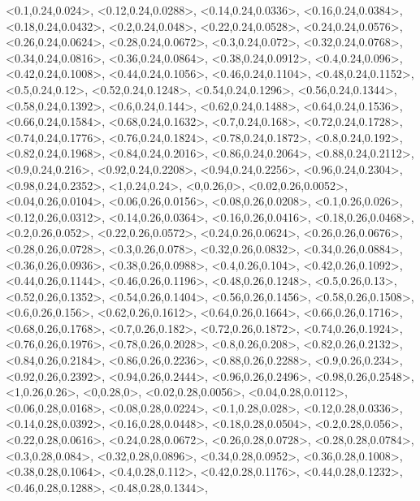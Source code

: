 \documentclass[a4paper,10pt]{article}
\begin{document}
\begin{eulernotebook}
\begin{euleroutput}
  <0.1,0.24,0.024>,
  <0.12,0.24,0.0288>,
  <0.14,0.24,0.0336>,
  <0.16,0.24,0.0384>,
  <0.18,0.24,0.0432>,
  <0.2,0.24,0.048>,
  <0.22,0.24,0.0528>,
  <0.24,0.24,0.0576>,
  <0.26,0.24,0.0624>,
  <0.28,0.24,0.0672>,
  <0.3,0.24,0.072>,
  <0.32,0.24,0.0768>,
  <0.34,0.24,0.0816>,
  <0.36,0.24,0.0864>,
  <0.38,0.24,0.0912>,
  <0.4,0.24,0.096>,
  <0.42,0.24,0.1008>,
  <0.44,0.24,0.1056>,
  <0.46,0.24,0.1104>,
  <0.48,0.24,0.1152>,
  <0.5,0.24,0.12>,
  <0.52,0.24,0.1248>,
  <0.54,0.24,0.1296>,
  <0.56,0.24,0.1344>,
  <0.58,0.24,0.1392>,
  <0.6,0.24,0.144>,
  <0.62,0.24,0.1488>,
  <0.64,0.24,0.1536>,
  <0.66,0.24,0.1584>,
  <0.68,0.24,0.1632>,
  <0.7,0.24,0.168>,
  <0.72,0.24,0.1728>,
  <0.74,0.24,0.1776>,
  <0.76,0.24,0.1824>,
  <0.78,0.24,0.1872>,
  <0.8,0.24,0.192>,
  <0.82,0.24,0.1968>,
  <0.84,0.24,0.2016>,
  <0.86,0.24,0.2064>,
  <0.88,0.24,0.2112>,
  <0.9,0.24,0.216>,
  <0.92,0.24,0.2208>,
  <0.94,0.24,0.2256>,
  <0.96,0.24,0.2304>,
  <0.98,0.24,0.2352>,
  <1,0.24,0.24>,
  <0,0.26,0>,
  <0.02,0.26,0.0052>,
  <0.04,0.26,0.0104>,
  <0.06,0.26,0.0156>,
  <0.08,0.26,0.0208>,
  <0.1,0.26,0.026>,
  <0.12,0.26,0.0312>,
  <0.14,0.26,0.0364>,
  <0.16,0.26,0.0416>,
  <0.18,0.26,0.0468>,
  <0.2,0.26,0.052>,
  <0.22,0.26,0.0572>,
  <0.24,0.26,0.0624>,
  <0.26,0.26,0.0676>,
  <0.28,0.26,0.0728>,
  <0.3,0.26,0.078>,
  <0.32,0.26,0.0832>,
  <0.34,0.26,0.0884>,
  <0.36,0.26,0.0936>,
  <0.38,0.26,0.0988>,
  <0.4,0.26,0.104>,
  <0.42,0.26,0.1092>,
  <0.44,0.26,0.1144>,
  <0.46,0.26,0.1196>,
  <0.48,0.26,0.1248>,
  <0.5,0.26,0.13>,
  <0.52,0.26,0.1352>,
  <0.54,0.26,0.1404>,
  <0.56,0.26,0.1456>,
  <0.58,0.26,0.1508>,
  <0.6,0.26,0.156>,
  <0.62,0.26,0.1612>,
  <0.64,0.26,0.1664>,
  <0.66,0.26,0.1716>,
  <0.68,0.26,0.1768>,
  <0.7,0.26,0.182>,
  <0.72,0.26,0.1872>,
  <0.74,0.26,0.1924>,
  <0.76,0.26,0.1976>,
  <0.78,0.26,0.2028>,
  <0.8,0.26,0.208>,
  <0.82,0.26,0.2132>,
  <0.84,0.26,0.2184>,
  <0.86,0.26,0.2236>,
  <0.88,0.26,0.2288>,
  <0.9,0.26,0.234>,
  <0.92,0.26,0.2392>,
  <0.94,0.26,0.2444>,
  <0.96,0.26,0.2496>,
  <0.98,0.26,0.2548>,
  <1,0.26,0.26>,
  <0,0.28,0>,
  <0.02,0.28,0.0056>,
  <0.04,0.28,0.0112>,
  <0.06,0.28,0.0168>,
  <0.08,0.28,0.0224>,
  <0.1,0.28,0.028>,
  <0.12,0.28,0.0336>,
  <0.14,0.28,0.0392>,
  <0.16,0.28,0.0448>,
  <0.18,0.28,0.0504>,
  <0.2,0.28,0.056>,
  <0.22,0.28,0.0616>,
  <0.24,0.28,0.0672>,
  <0.26,0.28,0.0728>,
  <0.28,0.28,0.0784>,
  <0.3,0.28,0.084>,
  <0.32,0.28,0.0896>,
  <0.34,0.28,0.0952>,
  <0.36,0.28,0.1008>,
  <0.38,0.28,0.1064>,
  <0.4,0.28,0.112>,
  <0.42,0.28,0.1176>,
  <0.44,0.28,0.1232>,
  <0.46,0.28,0.1288>,
  <0.48,0.28,0.1344>,

\end{euleroutput}
\end{eulernotebook}
\end{document}
